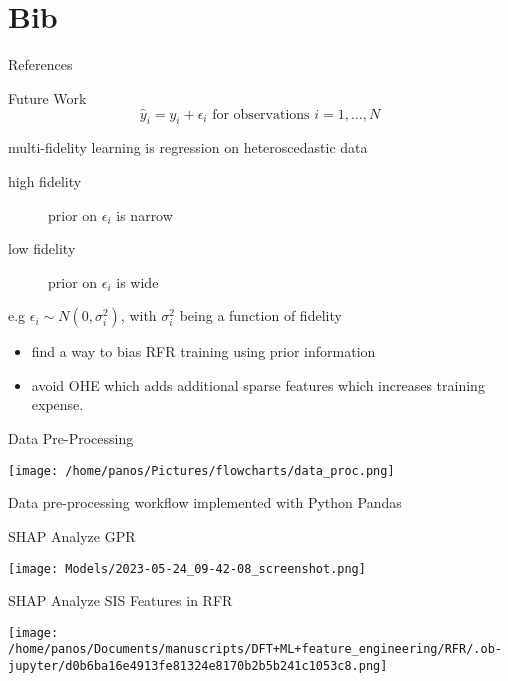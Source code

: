 \documentclass[10pt, aspectratio=169, presentation]{beamer}
\begin{document}
\section{Bib}
\label{sec:orgdff3e15}
\begin{frame}[allowframebreaks]{References}
\AtNextBibliography{\tiny}
\printbibliography
\end{frame}
\appendix
\begin{frame}[label={sec:org2d1c8fe}]{Future Work}
\[
\hat{y}_i = y_i + \epsilon_i \mbox{ for observations } i=1,…,N
\]

multi-fidelity learning \alert{is} regression on heteroscedastic data

\begin{description}
\item[{high fidelity}] prior on \(\epsilon_i\) is narrow
\item[{low fidelity}] prior on \(\epsilon_i\) is wide
\end{description}

e.g \(\epsilon_i \sim N(0,\sigma_i^2)\), with \(\sigma_i^2\) being a function of fidelity

\begin{itemize}
\item find a way to bias RFR training using prior information
\item avoid OHE which adds additional sparse features which increases training expense.
\end{itemize}
\end{frame}

\begin{frame}[label={sec:orgfb798ca}]{Data Pre-Processing}
\begin{center}
\texttt{[image: /home/panos/Pictures/flowcharts/data\_proc.png]}
\end{center}
\center{}Data pre-processing workflow implemented with Python Pandas
\end{frame}

\begin{frame}[label={sec:org5369737}]{SHAP Analyze GPR}
\begin{center}
\texttt{[image: Models/2023-05-24\_09-42-08\_screenshot.png]}
\end{center}
\end{frame}

\begin{frame}[label={sec:org59e0f47}]{SHAP Analyze SIS Features in RFR}
\begin{center}
\texttt{[image: /home/panos/Documents/manuscripts/DFT+ML+feature\_engineering/RFR/.ob-jupyter/d0b6ba16e4913fe81324e8170b2b5b241c1053c8.png]}
\end{center}
\end{frame}
\end{document}

